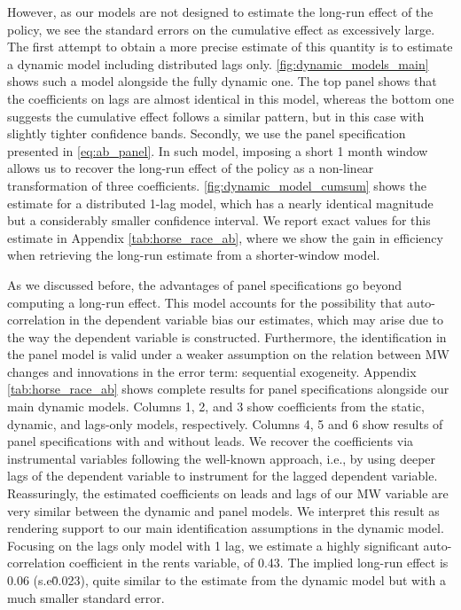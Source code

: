 However, as our models are not designed to estimate the long-run effect of the policy, we see 
the standard errors on the cumulative effect as excessively large. The first attempt to obtain 
a more precise estimate of this quantity is to estimate a dynamic model including distributed 
lags only. \autoref{fig:dynamic_models_main} shows such a model alongside the fully dynamic one. 
The top panel shows that the coefficients on lags are almost identical in this model, whereas 
the bottom one suggests the cumulative effect follows a similar pattern, but in this case with 
slightly tighter confidence bands. Secondly, we use the panel specification presented in 
\autoref{eq:ab_panel}. In such model, imposing a short 1 month window allows us to recover 
the long-run effect of the policy as a non-linear transformation of three coefficients. 
\autoref{fig:dynamic_model_cumsum} shows the estimate for a distributed 1-lag model, 
which has a nearly identical magnitude but a considerably smaller confidence interval. We report 
exact values for this estimate in Appendix \autoref{tab:horse_race_ab}, where we show the gain 
in efficiency when retrieving the long-run estimate from a shorter-window model. 

As we discussed before, the advantages of panel specifications go beyond computing a long-run 
effect. This model accounts for the possibility that auto-correlation in the dependent variable 
bias our estimates, which may arise due to the way the dependent variable is constructed. 
Furthermore, the identification in the panel model is valid under a weaker assumption on the 
relation between MW changes and innovations in the error term: sequential exogeneity. Appendix 
\autoref{tab:horse_race_ab} shows complete results for panel specifications alongside our main 
dynamic models. Columns 1, 2, and 3 show coefficients from the static, dynamic, and lags-only 
models, respectively. Columns 4, 5 and 6 show results of panel specifications with and without 
leads. We recover the coefficients via instrumental variables following the well-known 
\textcite{ArellanoBond1991} approach, i.e., by using deeper lags of the dependent variable to 
instrument for the lagged dependent variable. Reassuringly, the estimated coefficients on leads 
and lags of our MW variable are very similar between the dynamic and panel models. We interpret 
this result as rendering support to our main identification assumptions in the dynamic model. 
Focusing on the lags only model with 1 lag, we estimate a highly significant auto-correlation 
coefficient in the rents variable, of 0.43. The implied long-run effect is 0.06 (s.e\. 0.023), 
quite similar to the estimate from the dynamic model but with a much smaller standard error.


